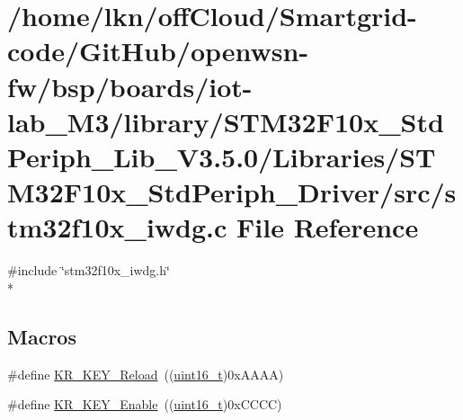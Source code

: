 \hypertarget{iot-lab___m3_2library_2_s_t_m32_f10x___std_periph___lib___v3_85_80_2_libraries_2_s_t_m32_f10x___c399b99adb51a529b02dfcc3842bf551}{}\section{/home/lkn/off\+Cloud/\+Smartgrid-\/code/\+Git\+Hub/openwsn-\/fw/bsp/boards/iot-\/lab\+\_\+\+M3/library/\+S\+T\+M32\+F10x\+\_\+\+Std\+Periph\+\_\+\+Lib\+\_\+\+V3.5.0/\+Libraries/\+S\+T\+M32\+F10x\+\_\+\+Std\+Periph\+\_\+\+Driver/src/stm32f10x\+\_\+iwdg.c File Reference}
\label{iot-lab___m3_2library_2_s_t_m32_f10x___std_periph___lib___v3_85_80_2_libraries_2_s_t_m32_f10x___c399b99adb51a529b02dfcc3842bf551}
{\ttfamily \#include \char`\"{}stm32f10x\+\_\+iwdg.\+h\char`\"{}}\\*
\subsection*{Macros}
\begin{DoxyCompactItemize}
\item 
\#define \hyperlink{group___i_w_d_g___private___defines_gad5e5efc1dbd6a045da5a36c3d9df16a5}{K\+R\+\_\+\+K\+E\+Y\+\_\+\+Reload}~((\hyperlink{_p_e___types_8h_a1f1825b69244eb3ad2c7165ddc99c956}{uint16\+\_\+t})0x\+A\+A\+A\+A)
\item 
\#define \hyperlink{group___i_w_d_g___private___defines_ga833138e20c8a26786dd7ca3b132152ed}{K\+R\+\_\+\+K\+E\+Y\+\_\+\+Enable}~((\hyperlink{_p_e___types_8h_a1f1825b69244eb3ad2c7165ddc99c956}{uint16\+\_\+t})0x\+C\+C\+C\+C)
\end{DoxyCompactItemize}
